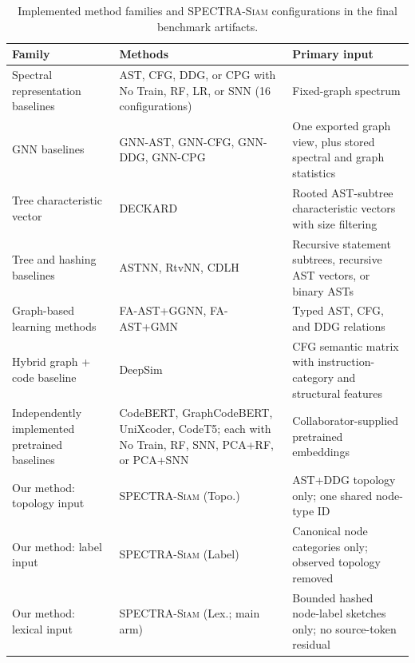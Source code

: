 \documentclass[authoryear,final,5p,times,twocolumn]{elsarticle}
\newcommand{\method}{\textsc{SPECTRA-Siam}}
\theoremstyle{plain}
\begin{document}
\begingroup
\color{green!50!black}
\begin{table}[t]
\centering
\caption{Implemented method families and \method{} configurations in the final
benchmark artifacts.}
\label{tab:baselines}
\footnotesize
\setlength{\tabcolsep}{4pt}
\begin{tabularx}{\textwidth}{@{}p{}X p{}@{}}
\toprule
Family & Methods & Primary input \\
\midrule
Spectral representation baselines & AST, CFG, DDG, or CPG with No Train, RF,
LR, or SNN (16 configurations) & Fixed-graph spectrum \\
GNN baselines & GNN-AST, GNN-CFG, GNN-DDG, GNN-CPG & One exported graph view,
plus stored spectral and graph statistics \\
Tree characteristic vector & DECKARD & Rooted AST-subtree characteristic vectors with size filtering \\
Tree and hashing baselines & ASTNN, RtvNN, CDLH & Recursive statement subtrees,
recursive AST vectors, or binary ASTs \\
Graph-based learning methods & FA-AST+GGNN, FA-AST+GMN & Typed AST, CFG, and DDG relations \\
Hybrid graph + code baseline & DeepSim & CFG semantic matrix with instruction-category and structural features \\
Independently implemented pretrained baselines & CodeBERT, GraphCodeBERT,
UniXcoder, CodeT5; each with No Train, RF, SNN, PCA+RF, or PCA+SNN & Collaborator-supplied pretrained embeddings \\
\midrule
Our method: topology input & \method{} (Topo.) & AST+DDG topology only; one shared node-type ID \\
Our method: label input & \method{} (Label) & Canonical node categories only; observed topology removed \\
Our method: lexical input & \method{} (Lex.; main arm) & Bounded hashed node-label sketches only; no source-token residual \\
\bottomrule
\end{tabularx}
\end{table}
\endgroup
\end{document}
